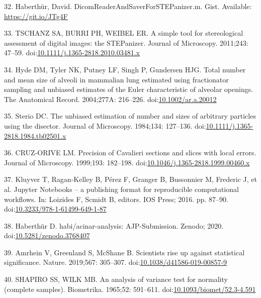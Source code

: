\documentclass[
  american,
]{article}
\newenvironment{cslreferences}%
  {}%
  {\par}
\begin{document}
\begin{cslreferences}
\leavevmode\hypertarget{ref-12Z2YPzm8}{}%
32. Haberthür, David. DicomReaderAndSaverForSTEPanizer.m. Gist. Available: \url{https://git.io/JTg4F}

\leavevmode\hypertarget{ref-nPoQ2EIB}{}%
33. TSCHANZ SA, BURRI PH, WEIBEL ER. A simple tool for stereological assessment of digital images: the STEPanizer. Journal of Microscopy. 2011;243: 47--59. doi:\href{https://doi.org/10.1111/j.1365-2818.2010.03481.x}{10.1111/j.1365-2818.2010.03481.x}

\leavevmode\hypertarget{ref-QiAxY2i3}{}%
34. Hyde DM, Tyler NK, Putney LF, Singh P, Gundersen HJG. Total number and mean size of alveoli in mammalian lung estimated using fractionator sampling and unbiased estimates of the Euler characteristic of alveolar openings. The Anatomical Record. 2004;277A: 216--226. doi:\href{https://doi.org/10.1002/ar.a.20012}{10.1002/ar.a.20012}

\leavevmode\hypertarget{ref-FJ9FoB4m}{}%
35. Sterio DC. The unbiased estimation of number and sizes of arbitrary particles using the disector. Journal of Microscopy. 1984;134: 127--136. doi:\href{https://doi.org/10.1111/j.1365-2818.1984.tb02501.x}{10.1111/j.1365-2818.1984.tb02501.x}

\leavevmode\hypertarget{ref-FE9HLB4f}{}%
36. CRUZ-ORIVE LM. Precision of Cavalieri sections and slices with local errors. Journal of Microscopy. 1999;193: 182--198. doi:\href{https://doi.org/10.1046/j.1365-2818.1999.00460.x}{10.1046/j.1365-2818.1999.00460.x}

\leavevmode\hypertarget{ref-pQ6Wbz73}{}%
37. Kluyver T, Ragan-Kelley B, Pérez F, Granger B, Bussonnier M, Frederic J, et al. Jupyter Notebooks -- a publishing format for reproducible computational workflows. In: Loizides F, Scmidt B, editors. IOS Press; 2016. pp. 87--90. doi:\href{https://doi.org/10.3233/978-1-61499-649-1-87}{10.3233/978-1-61499-649-1-87}

\leavevmode\hypertarget{ref-V87xbt0b}{}%
38. Haberthür D. habi/acinar-analysis: AJP-Submission. Zenodo; 2020. doi:\href{https://doi.org/10.5281/zenodo.3768407}{10.5281/zenodo.3768407}

\leavevmode\hypertarget{ref-o21zxPIu}{}%
39. Amrhein V, Greenland S, McShane B. Scientists rise up against statistical significance. Nature. 2019;567: 305--307. doi:\href{https://doi.org/10.1038/d41586-019-00857-9}{10.1038/d41586-019-00857-9}

\leavevmode\hypertarget{ref-IkHrgIj3}{}%
40. SHAPIRO SS, WILK MB. An analysis of variance test for normality (complete samples). Biometrika. 1965;52: 591--611. doi:\href{https://doi.org/10.1093/biomet/52.3-4.591}{10.1093/biomet/52.3-4.591}


\end{cslreferences}
\end{document}
